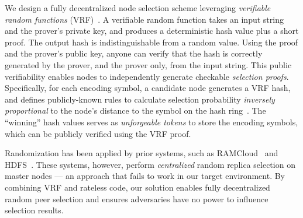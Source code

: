 We design a fully decentralized node selection scheme leveraging \emph{verifiable random functions} (VRF)~\cite{vrf}.
A verifiable random function takes an input string and the prover's private key, and produces a deterministic hash value plus a short proof.
The output hash is indistinguishable from a random value.
Using the proof and the prover's public key, anyone can verify that the hash is correctly generated by the prover, and the prover only, from the input string.
This public verifiability enables \sys nodes to independently generate checkable \emph{selection proofs}.
Specifically, for each encoding symbol, a candidate node generates a VRF hash, and \sys defines publicly-known rules to calculate selection probability \emph{inversely proportional} to the node's distance to the symbol on the hash ring~\cite{chash,chord}.
The ``winning'' hash values serves as \textit{unforgeable tokens} to store the encoding symbols, which can be publicly verified using the VRF proof.


Randomization has been applied by prior systems, such as RAMCloud~\cite{ramcloud} and HDFS~\cite{hdfs}.
These systems, however, perform \emph{centralized} random replica selection on master nodes --- an approach that fails to work in our target environment.
By combining VRF and rateless code, our solution enables fully decentralized random peer selection and ensures adversaries have no power to influence selection results.
\fi

\iffalse


